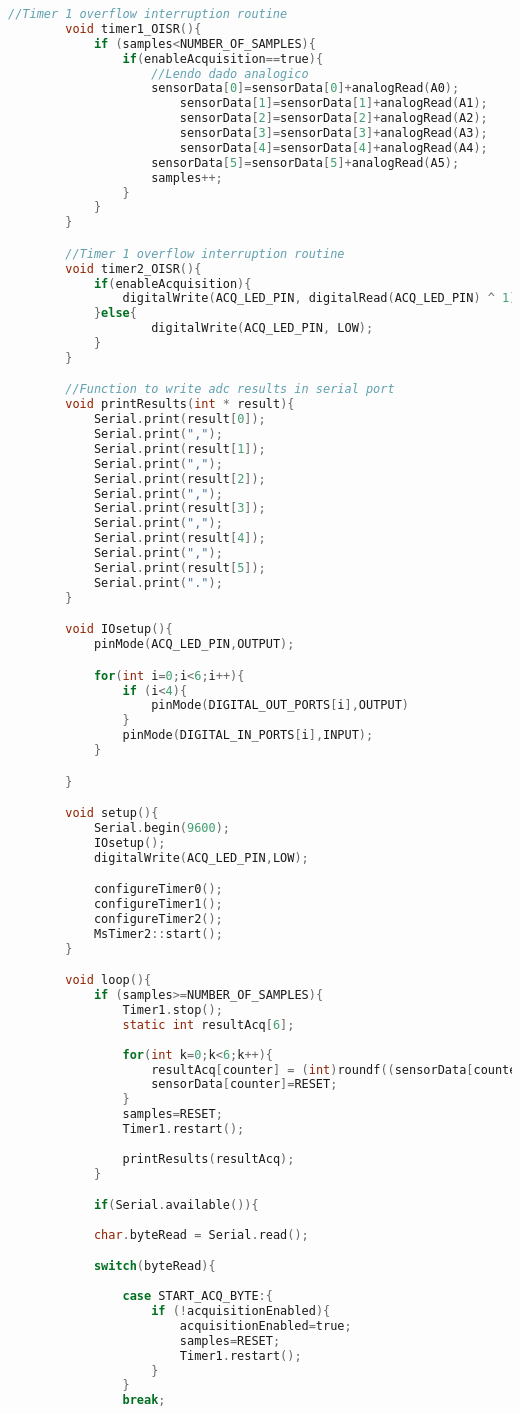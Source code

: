 \begin{lstlisting}[language=C]
		//Timer 1 overflow interruption routine
		void timer1_OISR(){
			if (samples<NUMBER_OF_SAMPLES){
				if(enableAcquisition==true){
					//Lendo dado analogico
					sensorData[0]=sensorData[0]+analogRead(A0);
						sensorData[1]=sensorData[1]+analogRead(A1);
						sensorData[2]=sensorData[2]+analogRead(A2);
						sensorData[3]=sensorData[3]+analogRead(A3);
						sensorData[4]=sensorData[4]+analogRead(A4);
					sensorData[5]=sensorData[5]+analogRead(A5);
					samples++;
				}   
			}
		}

		//Timer 1 overflow interruption routine
		void timer2_OISR(){
			if(enableAcquisition){
				digitalWrite(ACQ_LED_PIN, digitalRead(ACQ_LED_PIN) ^ 1);
			}else{
					digitalWrite(ACQ_LED_PIN, LOW);
			}
		}

		//Function to write adc results in serial port
		void printResults(int * result){    
			Serial.print(result[0]);
			Serial.print(",");
			Serial.print(result[1]);
			Serial.print(",");
			Serial.print(result[2]);
			Serial.print(",");
			Serial.print(result[3]);
			Serial.print(",");
			Serial.print(result[4]);
			Serial.print(",");
			Serial.print(result[5]);
			Serial.print(".");
		}

		void IOsetup(){
			pinMode(ACQ_LED_PIN,OUTPUT);

			for(int i=0;i<6;i++){
				if (i<4){
					pinMode(DIGITAL_OUT_PORTS[i],OUTPUT)
				}
				pinMode(DIGITAL_IN_PORTS[i],INPUT);
			}

		}

		void setup(){
			Serial.begin(9600);
			IOsetup();
			digitalWrite(ACQ_LED_PIN,LOW);

			configureTimer0();
			configureTimer1();
			configureTimer2();
			MsTimer2::start();
		}

		void loop(){
			if (samples>=NUMBER_OF_SAMPLES){
				Timer1.stop();
				static int resultAcq[6];
			
				for(int k=0;k<6;k++){
					resultAcq[counter] = (int)roundf((sensorData[counter]/NUMBER_OF_SAMPLES));
					sensorData[counter]=RESET;
				}
				samples=RESET;
				Timer1.restart();
				
				printResults(resultAcq);
			}

			if(Serial.available()){
			
			char.byteRead = Serial.read();

			switch(byteRead){
				
				case START_ACQ_BYTE:{
					if (!acquisitionEnabled){
						acquisitionEnabled=true;
						samples=RESET;
						Timer1.restart();
					}
				}
				break;


\end{lstlisting}
